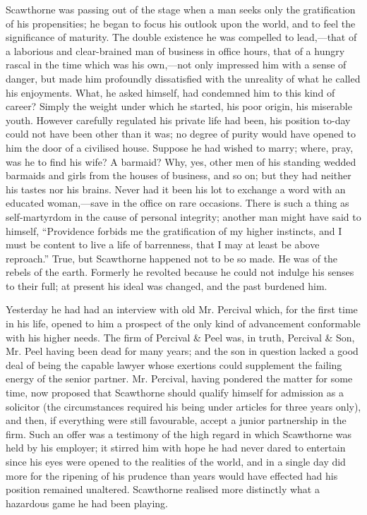 Scawthorne was passing out of the stage when a man seeks only the
gratification of his {\protect\hypertarget{49}{}{}}propensities; he
began to focus his outlook upon the world, and to feel the significance
of maturity. The double existence he was compelled to lead,---that of a
laborious and clear-brained man of business in office hours, that of a
hungry rascal in the time which was his own,---not only impressed him
with a sense of danger, but made him profoundly dissatisfied with the
unreality of what he called his enjoyments. What, he asked himself, had
condemned him to this kind of career? Simply the weight under which he
started, his poor origin, his miserable youth. However carefully
regulated his private life had been, his position to-day could not have
been other than it was; no degree of purity would have opened to him the
door of a civilised house. Suppose he had wished to marry; where, pray,
was he to find his wife? A barmaid? Why, yes, other men of his standing
wedded barmaids and girls from the houses of business, and so on; but
they had neither his tastes nor his brains. Never had it been his lot to
exchange a word with an educated woman,---save in the office on rare
occasions. There is such a thing as self-martyrdom in the cause of
personal integrity; {\protect\hypertarget{50}{}{}}another man might have
said to himself, ``Providence forbids me the gratification of my higher
instincts, and I must be content to live a life of barrenness, that I
may at least be above reproach.'' True, but Scawthorne happened not to
be so made. He was of the rebels of the earth. Formerly he revolted
because he could not indulge his senses to their full; at present his
ideal was changed, and the past burdened him.

Yesterday he had had an interview with old Mr. Percival which, for the
first time in his life, opened to him a prospect of the only kind of
advancement conformable with his higher needs. The firm of Percival \&
Peel was, in truth, Percival \& Son, Mr. Peel having been dead for many
years; and the son in question lacked a good deal of being the capable
lawyer whose exertions could supplement the failing energy of the senior
partner. Mr. Percival, having pondered the matter for some time, now
proposed that Scawthorne should qualify himself for admission as a
solicitor (the circumstances required his being under articles for three
years only), and then, if everything were still favourable, accept a
junior partnership in {\protect\hypertarget{51}{}{}}the firm. Such an
offer was a testimony of the high regard in which Scawthorne was held by
his employer; it stirred him with hope he had never dared to entertain
since his eyes were opened to the realities of the world, and in a
single day did more for the ripening of his prudence than years would
have effected had his position remained unaltered. Scawthorne realised
more distinctly what a hazardous game he had been playing.

